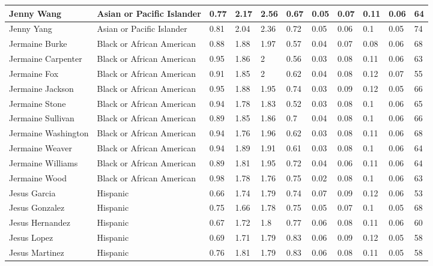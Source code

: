 \begin{table}[!ht]
\begin{tabular}{|l|l|l|l|l|l|l|l|l|l|l|}
        Jenny Wang & Asian or Pacific Islander & 0.77 & 2.17 & 2.56 & 0.67 & 0.05 & 0.07 & 0.11 & 0.06 & 64 \\ \hline
        Jenny Yang & Asian or Pacific Islander & 0.81 & 2.04 & 2.36 & 0.72 & 0.05 & 0.06 & 0.1 & 0.05 & 74 \\ \hline
        Jermaine Burke & Black or African American & 0.88 & 1.88 & 1.97 & 0.57 & 0.04 & 0.07 & 0.08 & 0.06 & 68 \\ \hline
        Jermaine Carpenter & Black or African American & 0.95 & 1.86 & 2 & 0.56 & 0.03 & 0.08 & 0.11 & 0.06 & 63 \\ \hline
        Jermaine Fox & Black or African American & 0.91 & 1.85 & 2 & 0.62 & 0.04 & 0.08 & 0.12 & 0.07 & 55 \\ \hline
        Jermaine Jackson & Black or African American & 0.95 & 1.88 & 1.95 & 0.74 & 0.03 & 0.09 & 0.12 & 0.05 & 66 \\ \hline
        Jermaine Stone & Black or African American & 0.94 & 1.78 & 1.83 & 0.52 & 0.03 & 0.08 & 0.1 & 0.06 & 65 \\ \hline
        Jermaine Sullivan & Black or African American & 0.89 & 1.85 & 1.86 & 0.7 & 0.04 & 0.08 & 0.1 & 0.06 & 66 \\ \hline
        Jermaine Washington & Black or African American & 0.94 & 1.76 & 1.96 & 0.62 & 0.03 & 0.08 & 0.11 & 0.06 & 68 \\ \hline
        Jermaine Weaver & Black or African American & 0.94 & 1.89 & 1.91 & 0.61 & 0.03 & 0.08 & 0.1 & 0.06 & 64 \\ \hline
        Jermaine Williams & Black or African American & 0.89 & 1.81 & 1.95 & 0.72 & 0.04 & 0.06 & 0.11 & 0.06 & 64 \\ \hline
        Jermaine Wood & Black or African American & 0.98 & 1.78 & 1.76 & 0.75 & 0.02 & 0.08 & 0.1 & 0.06 & 63 \\ \hline
        Jesus Garcia & Hispanic & 0.66 & 1.74 & 1.79 & 0.74 & 0.07 & 0.09 & 0.12 & 0.06 & 53 \\ \hline
        Jesus Gonzalez & Hispanic & 0.75 & 1.66 & 1.78 & 0.75 & 0.05 & 0.07 & 0.1 & 0.05 & 68 \\ \hline
        Jesus Hernandez & Hispanic & 0.67 & 1.72 & 1.8 & 0.77 & 0.06 & 0.08 & 0.11 & 0.06 & 60 \\ \hline
        Jesus Lopez & Hispanic & 0.69 & 1.71 & 1.79 & 0.83 & 0.06 & 0.09 & 0.12 & 0.05 & 58 \\ \hline
        Jesus Martinez & Hispanic & 0.76 & 1.81 & 1.79 & 0.83 & 0.06 & 0.08 & 0.11 & 0.05 & 58 \\ \hline

\end{tabular}
\end{table}
